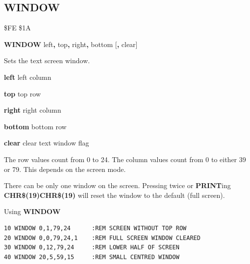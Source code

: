 \subsection{WINDOW}
\begin{description}[leftmargin=2cm,style=nextline]
\item [Token:] \$FE \$1A
\item [Format:] {\bf WINDOW} left{\bf,} top{\bf,} right{\bf,} bottom
		[{\bf,} clear]
\item [Usage:] Sets the text screen window.

                 {\bf left} left column

                 {\bf top} top row

                 {\bf right} right column

                 {\bf bottom} bottom row

                 {\bf clear} clear text window flag

\item [Remarks:] The row values count from 0 to 24.
                 The column values count from 0 to either 39 or 79.
                 This depends on the screen mode.

                 There can be only one window on the screen.
                 Pressing  twice or {\bf PRINT}ing
                 {\bf CHR\$(19)CHR\$(19)} will reset the window
                 to the default (full screen).

\item [Example:] Using {\bf WINDOW}
\begin{tcolorbox}[colback=black,coltext=white]
\verbatimfont{\codefont}
\begin{verbatim}
10 WINDOW 0,1,79,24      :REM SCREEN WITHOUT TOP ROW
20 WINDOW 0,0,79,24,1    :REM FULL SCREEN WINDOW CLEARED
30 WINDOW 0,12,79,24     :REM LOWER HALF OF SCREEN
40 WINDOW 20,5,59,15     :REM SMALL CENTRED WINDOW
\end{verbatim}
\end{tcolorbox}
\end{description}


\newpage
